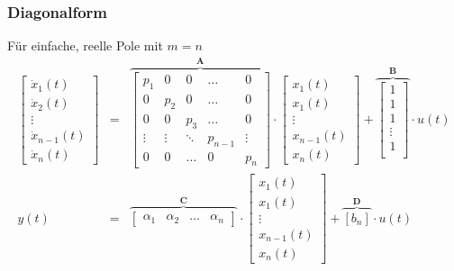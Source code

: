 \subsubsection{Diagonalform }
\begin{multicols}{2}
  Für einfache, reelle Pole mit $m=n$ \\
  \scriptsize 
    \begin{eqnarray*}
      \begin{bmatrix}
        \dot{x}_1(t) \\
        \dot{x}_2(t) \\
        \vdots \\
        \dot{x}_{n-1}(t) \\
        \dot{x}_n(t)
      \end{bmatrix} &=& \overbrace{ \begin{bmatrix}
        p_1 & 0 & 0 & \ldots & 0 \\
        0 & p_2 & 0 & \ldots & 0 \\
        0 & 0 & p_3 & \ldots & 0 \\
        \vdots & \vdots & \ddots & p_{n-1} & \vdots \\
        0 & 0 & \ldots & 0 & p_n
      \end{bmatrix}}^{\mathbf A} \cdot \begin{bmatrix}
        x_1(t) \\
        x_1(t) \\
        \vdots \\
        x_{n-1}(t) \\
        x_n(t)
      \end{bmatrix} + \overbrace{\begin{bmatrix}
        1 \\
        1 \\
        1 \\
        \vdots \\
        1 \\
      \end{bmatrix}}^{\mathbf{B}} \cdot u(t) \\
      y(t) &=& \overbrace{\begin{bmatrix}
        \alpha_1 & \alpha_2 & \ldots & \alpha_n
      \end{bmatrix}}^{\mathbf{C}} \cdot \begin{bmatrix}
        x_1(t) \\
        x_1(t) \\
        \vdots \\
        x_{n-1}(t) \\
        x_n(t)
      \end{bmatrix} + \overbrace{[b_n]}^{\mathbf{D}} \cdot u(t)
    \end{eqnarray*}
  \normalsize


\end{multicols}
